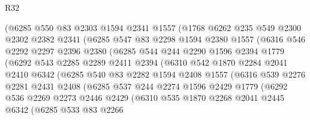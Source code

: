 \begin{lexlean}{R32}
\begin{coremodule}
            (@6285
              @550
              @83
              @2303
              @1594
              @2341
              @1557
              (@1768
                @6262
                @235
                @549
                @2300
                @2302
                @2382
                @2341
                (@6285
                  @547
                  @83
                  @2298
                  @1594
                  @2380
                  @1557
                  (@6316
                    @546
                    @2292
                    @2297
                    @2396
                    @2380
                    (@6285
                      @544
                      @244
                      @2290
                      @1596
                      @2394
                      @1779
                      (@6292
                        @543
                        @2285
                        @2289
                        @2411
                        @2394
                        (@6310
                          @542
                          @1870
                          @2284
                          @2041
                          @2410
                          @6342
                          (@6285
                            @540
                            @83
                            @2282
                            @1594
                            @2408
                            @1557
                            (@6316
                              @539
                              @2276
                              @2281
                              @2431
                              @2408
                              (@6285
                                @537
                                @244
                                @2274
                                @1596
                                @2429
                                @1779
                                (@6292
                                  @536
                                  @2269
                                  @2273
                                  @2446
                                  @2429
                                  (@6310
                                    @535
                                    @1870
                                    @2268
                                    @2041
                                    @2445
                                    @6342
                                    (@6285
                                      @533
                                      @83
                                      @2266

\end{coremodule}
\end{lexlean}
